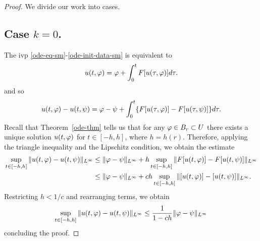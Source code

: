 \begin{proof}
  We divide our work into cases.
  \subsection{Case $k = 0$.} The ivp \eqref{ode-eq-sm}-\eqref{ode-init-data-sm} is equivalent to 
  \begin{equation*}
  \begin{split}
  u(t, \varphi) = \varphi + \int_{0}^{t} F[u(\tau, \varphi)] d \tau.
  \end{split}
  \end{equation*}
  and so
  \begin{equation*}
    \begin{split}
  u(t, \varphi) - u(t, \psi) = \varphi - \psi + \int_{0}^{t} \{F[u(\tau, \varphi)] - F[u(\tau, \psi)]\} d \tau.
  \end{split}
  \end{equation*}
 Recall that Theorem~\ref{ode-thm} tells us that for any $\varphi \in B_{r} \subset U$ there exists a unique solution $u(t, \varphi)$ for $t \in [-h, h]$, where $h = h(r)$. Therefore, applying the triangle inequality and the Lipschitz condition, we obtain the estimate
  \begin{equation*}
  \begin{split}
  \sup_{t \in [-h, h]} \|u(t, \varphi) - u(t, \psi)\|_{L^{\infty}}
  & \le \|\varphi -
  \psi\|_{L^{\infty}} +  h \sup_{t \in [-h, h]} \|F[u(t, \varphi)] - F[u(t, \psi)] \|_{L^{\infty}}
  \\
  & \le \|\varphi - \psi\|_{L^{\infty}} +  ch \sup_{t \in [-h, h]} \|[u(t, \varphi)] -
  [u(t, \psi)] \|_{L^{\infty}}.
  \end{split}
  \end{equation*}
Restricting $h < 1/c$ and rearranging terms, we obtain
%
%
\begin{equation*}
\begin{split}
\sup_{t \in [-h, h]} \| u(t, \varphi) - u(t, \psi) \|_{L^{\infty}} \le \frac{1}{1-ch} \| \varphi - \psi \|_{L^{\infty}}
\end{split}
\end{equation*}
%
%
concluding the proof.

\end{proof}
